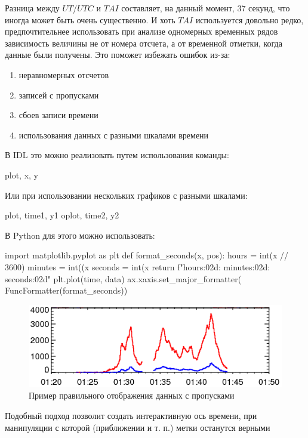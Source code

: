 Разница между $UT$/$UTC$ и $TAI$ составляет, на данный момент, $37$ секунд, что иногда может быть очень существенно. И хоть $TAI$ используется довольно редко, предпочтительнее использовать при анализе одномерных временных рядов зависимость величины не от номера отсчета, а от временной отметки, когда данные были получены. Это поможет избежать ошибок из-за:
\begin{enumerate}
	\item неравномерных отсчетов
	\item записей с пропусками
	\item сбоев записи времени
	\item использования данных с разными шкалами времени
\end{enumerate}
В IDL это можно реализовать путем использования команды:
\begin{python}
	plot, x, y
\end{python}
Или при использовании нескольких графиков с разными шкалами:
\begin{python}
	plot, time1, y1
	oplot, time2, y2
\end{python}
В Python для этого можно использовать:
\begin{python}
	import matplotlib.pyplot as plt
	def format_seconds(x, pos):
	hours = int(x // 3600)
	minutes = int((x %
	seconds = int(x %
	return f"{hours:02d}:
	{minutes:02d}:
	{seconds:02d}"
	plt.plot(time, data)
	ax.xaxis.set_major_formatter(
	FuncFormatter(format_seconds))
\end{python}

\begin{figure}[h!]
	\centering
	\includegraphics[width=0.65\linewidth]{images/grechnev3.png}
	\caption{Пример правильного отображения данных с пропусками}
	\label{grechnev3}
\end{figure}

Подобный подход позволит создать интерактивную ось времени, при манипуляции с которой (приближении и т. п.) метки останутся верными

